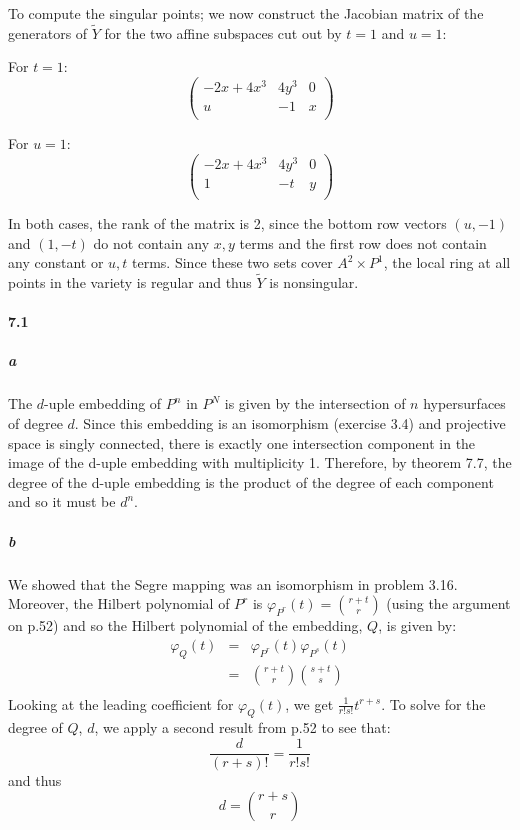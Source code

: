 \documentclass{article}
\begin{document}
To compute the singular points; we now construct the Jacobian matrix of the generators of $\tilde{Y}$ for the two affine subspaces cut out by $t = 1$ and $u=1$:

For $t=1$:
\[
\begin{pmatrix}
-2x + 4x^3 & 4y^3 & 0 \\
u & -1 & x \\
\end{pmatrix}
\]

For $u = 1$:
\[
\begin{pmatrix}
-2x + 4x^3 & 4y^3 & 0 \\
1 & -t & y \\
\end{pmatrix}
\]

In both cases, the rank of the matrix is 2, since the bottom row vectors $(u,-1)$ and $(1,-t)$ do not contain any $x,y$ terms and the first row does not contain any constant or $u,t$ terms.  Since these two sets cover $A^2 \times P^1$, the local ring at all points in the variety is regular and thus $\tilde{Y}$ is nonsingular. 


\paragraph{7.1}

\subparagraph{a}

The $d$-uple embedding of $P^n$ in $P^N$ is given by the intersection of $n$ hypersurfaces of degree $d$.  Since this embedding is an isomorphism (exercise 3.4) and projective space is singly connected, there is exactly one intersection component in the image of the d-uple embedding with multiplicity 1.  Therefore, by theorem 7.7, the degree of the d-uple embedding is the product of the degree of each component and so it must be $d^n$. 

\subparagraph{b}
We showed that the Segre mapping was an isomorphism in problem 3.16.  Moreover, the Hilbert polynomial of $P^r$ is $\varphi_{P^r}(t) = { r + t \choose r }$ (using the argument on p.52) and so the Hilbert polynomial of the embedding, $Q$, is given by:
\begin{eqnarray*}
\varphi_{Q}(t)  & = & \varphi_{P^r}(t) \varphi_{P^s}(t) \\
& = & { r + t \choose r } { s + t \choose s } \\
\end{eqnarray*}
Looking at the leading coefficient for $\varphi_{Q}(t)$, we get $\frac{1}{r! s!} t^{r + s}$.  To solve for the degree of $Q$, $d$, we apply a second result from p.52 to see that:
\[ \frac{d}{(r + s)!} = \frac{1}{r! s!} \]
and thus 
\[ d = { r + s \choose r }  \]
\end{document}
